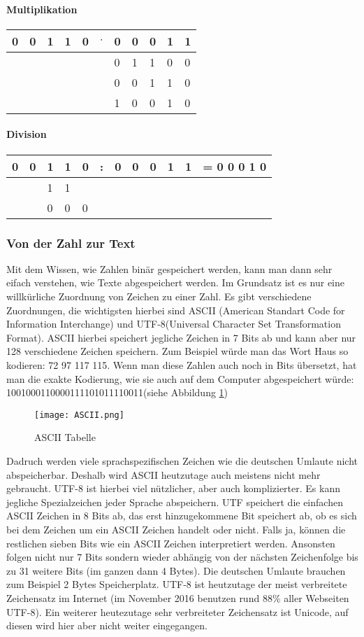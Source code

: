 \paragraph{Multiplikation}
\begin{tabular}{lllllllllll}
0&0&1&1&0& $\cdot$ &0&0&0&1&1 \\ \hline
&&&&&&0&1&1&0&0 \\
&&&&&&0&0&1&1&0 \\ \hline
&&&&&&1&0&0&1&0
\end{tabular}
\paragraph{Division}
\begin{tabular}{lllllllllll l}
0&0&1&1&0& : &0&0&0&1&1 & = 0 0 0 1 0 \\ \hline
 & &1&1& & &&&&&& \\ \cline{3-4}
 & &0&0&0& &&&&&& \\ 
\end{tabular}
\subsubsection{Von der Zahl zur Text}
Mit dem Wissen, wie Zahlen binär gespeichert werden, kann man dann sehr eifach verstehen, wie Texte abgespeichert werden. Im Grundsatz ist es nur eine willkürliche Zuordnung von Zeichen zu einer Zahl. Es gibt verschiedene Zuordnungen, die wichtigsten hierbei sind ASCII (American Standart Code for Information Interchange) und UTF-8(Universal Character Set Transformation Format). ASCII hierbei speichert jegliche Zeichen in 7 Bits ab und kann aber nur 128 verschiedene Zeichen speichern. Zum Beispiel würde man das Wort Haus so kodieren: 72 97 117 115. Wenn man diese Zahlen auch noch in Bits übersetzt, hat man die exakte Kodierung, wie sie auch auf dem Computer abgespeichert würde: 1001000110000111101011110011(siehe Abbildung \ref{fig:ASCII})
\begin{figure}[htbp] 
  \centering
     \texttt{[image: ASCII.png]}
  \caption{ASCII Tabelle \cite{ASCII}}
  \label{fig:ASCII}
\end{figure}
Dadruch werden viele sprachspezifischen Zeichen wie die deutschen Umlaute nicht abspeicherbar. Deshalb wird ASCII heutzutage auch meistens nicht mehr gebraucht. UTF-8 ist hierbei viel nützlicher, aber auch komplizierter. Es kann jegliche Spezialzeichen jeder Sprache abspeichern. UTF speichert die einfachen ASCII Zeichen in 8 Bits ab, das erst hinzugekommene Bit speichert ab, ob es sich bei dem Zeichen um ein ASCII Zeichen handelt oder nicht. Falls ja, können die restlichen sieben Bits wie ein ASCII Zeichen interpretiert werden. Ansonsten folgen nicht nur 7 Bits sondern wieder abhängig von der nächsten Zeichenfolge bis zu 31 weitere Bits (im ganzen dann 4 Bytes). Die deutschen Umlaute brauchen zum Beispiel 2 Bytes Speicherplatz. UTF-8 ist heutzutage der meist verbreitete Zeichensatz im Internet (im November 2016 benutzen rund 88\% aller Webseiten UTF-8). \cite{UTF-8} Ein weiterer heutezutage sehr verbreiteter Zeichensatz ist Unicode, auf diesen wird hier aber nicht weiter eingegangen.
